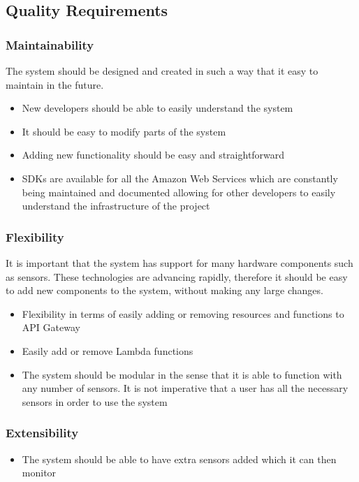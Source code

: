 \documentclass{article}
\begin{document}
\subsection{Quality Requirements}

\subsubsection{Maintainability}
The system should be designed and created in such a way that it easy to maintain in the future.
\begin{itemize}
	\item New developers should be able to easily understand the system
	\item It should be easy to modify parts of the system
	\item Adding new functionality should be easy and straightforward
	\item SDKs are available for all the Amazon Web Services which are constantly being maintained and documented allowing for other developers to easily understand the infrastructure of the project
\end{itemize}
\subsubsection{Flexibility}
It is important that the system has support for many hardware components such as sensors. These technologies are advancing rapidly, therefore it should be easy to add new components to the system, without making any large changes.

	\begin{itemize}
		\item Flexibility in terms of easily adding or removing resources and functions to API Gateway
		\item Easily add or remove Lambda functions
		\item The system should be modular in the sense that it is able to function with any number of sensors. It is not imperative that a user has all the necessary sensors in order to use the system
	\end{itemize}
\subsubsection{Extensibility}
	\begin{itemize}
		\item The system should be able to have extra sensors added which it can then monitor
	\end{itemize}
\end{document}
